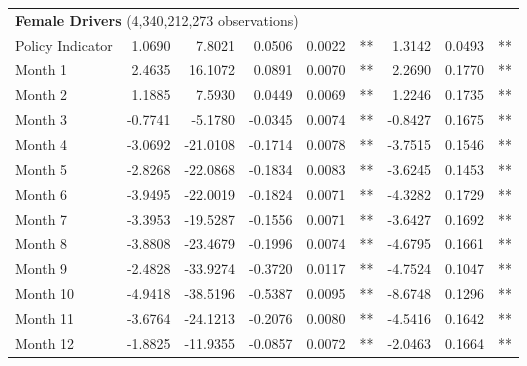 \begin{table}
\begin{tabular}{l r r r r l r r l}
\hline 

\multicolumn{7}{l}{\textbf{Female Drivers} (4,340,212,273 observations)} \\ 

Policy Indicator          &  1.0690        &  7.8021       &  0.0506        &  0.0022       &   **       &  1.3142        &  0.0493       &   **       \\ 
Month 1                         &  2.4635        &  16.1072       &  0.0891        &  0.0070       &   **       &  2.2690        &  0.1770       &   **       \\ 
Month 2                         &  1.1885        &  7.5930       &  0.0449        &  0.0069       &   **       &  1.2246        &  0.1735       &   **       \\ 
Month 3                         &  -0.7741        &  -5.1780       &  -0.0345        &  0.0074       &   **       &  -0.8427        &  0.1675       &   **       \\ 
Month 4                         &  -3.0692        &  -21.0108       &  -0.1714        &  0.0078       &   **       &  -3.7515        &  0.1546       &   **       \\ 
Month 5                         &  -2.8268        &  -22.0868       &  -0.1834        &  0.0083       &   **       &  -3.6245        &  0.1453       &   **       \\ 
Month 6                         &  -3.9495        &  -22.0019       &  -0.1824        &  0.0071       &   **       &  -4.3282        &  0.1729       &   **       \\ 
Month 7                         &  -3.3953        &  -19.5287       &  -0.1556        &  0.0071       &   **       &  -3.6427        &  0.1692       &   **       \\ 
Month 8                         &  -3.8808        &  -23.4679       &  -0.1996        &  0.0074       &   **       &  -4.6795        &  0.1661       &   **       \\ 
Month 9                         &  -2.4828        &  -33.9274       &  -0.3720        &  0.0117       &   **       &  -4.7524        &  0.1047       &   **       \\ 
Month 10                        &  -4.9418        &  -38.5196       &  -0.5387        &  0.0095       &   **       &  -8.6748        &  0.1296       &   **       \\ 
Month 11                        &  -3.6764        &  -24.1213       &  -0.2076        &  0.0080       &   **       &  -4.5416        &  0.1642       &   **       \\ 
Month 12                        &  -1.8825        &  -11.9355       &  -0.0857        &  0.0072       &   **       &  -2.0463        &  0.1664       &   **       \\ 


\end{tabular}
\end{table}

